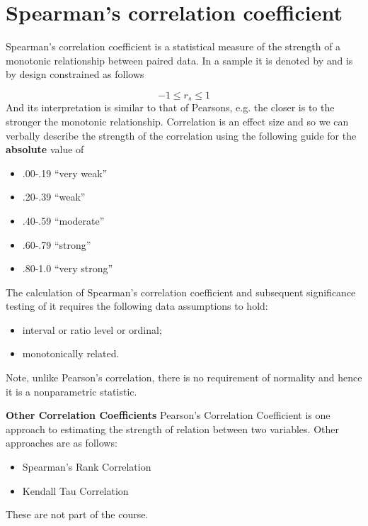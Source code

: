 \documentclass[]{report}
\begin{document}

\section{Spearman’s correlation coefficient }

Spearman’s correlation coefficient is a statistical measure of the strength of a 
monotonic relationship between paired data. In a sample it is denoted by 
and is by 
design constrained as follows 

\[ -1 \leq r_s \leq 1 \]
And its interpretation is similar to that of Pearsons, e.g. the closer 
is to the stronger the monotonic relationship. Correlation is an effect size and so we can verbally describe the strength of the correlation using the following guide for the 
\textbf{absolute} value of 

\begin{itemize}
	\item .00-.19 “very weak” 
	\item .20-.39 “weak” 
	\item .40-.59 “moderate” 
	\item .60-.79 “strong” 
	\item .80-1.0 “very strong” 
\end{itemize}

The calculation of Spearman’s correlation coefficient and subsequent significance 
testing of it requires the following data assumptions to hold: 

\begin{itemize}
	\item interval or ratio level or ordinal; 
	\item monotonically related. 
\end{itemize}

Note, unlike Pearson’s correlation, there is no requirement of normality and hence it 
is a nonparametric statistic. 





	\noindent \textbf{Other Correlation Coefficients}
	Pearson's Correlation Coefficient is one approach to estimating the strength of relation between two variables.
	Other approaches are as follows:
	\begin{itemize}
		\item Spearman's Rank Correlation
		\item Kendall Tau Correlation
	\end{itemize}
	These are not part of the course.
\end{document}
